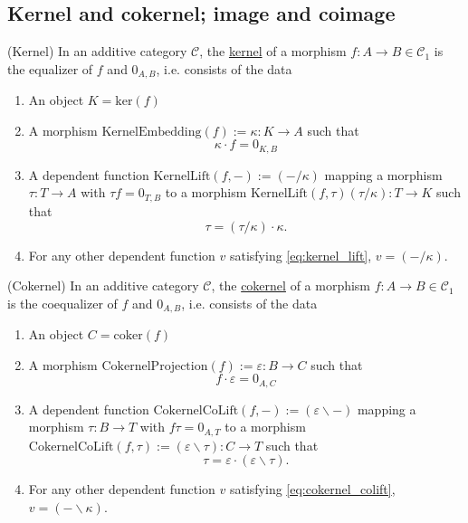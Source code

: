 \subsection{Kernel and cokernel; image and coimage}

\begin{definition}{(Kernel)}
In an additive category $\mathcal{C}$, the \ul{kernel} of a morphism $f : A \rightarrow B \in \mathcal{C}_{1}$ is the equalizer of $f$ and $0_{A,B}$,
i.e. consists of the data
\begin{enumerate}
\renewcommand{\labelenumi}{(\theenumi)}
\item An object $K = \mathrm{ker}(f)$
\item A morphism $\mathrm{KernelEmbedding}(f) := \kappa : K \rightarrow A$ such that
\[
\kappa \cdot f = 0_{K,B}
\]
\item A dependent function $\mathrm{KernelLift}(f,-) := ( - /\kappa)$ mapping a morphism $\tau : T \rightarrow A$ with $\tau f = 0_{T,B}$ to a
morphism $\mathrm{KernelLift}(f,\tau) (\tau / \kappa) : T \rightarrow K$ such that
\[
\tau =\label{eq:kernel_lift} (\tau / \kappa) \cdot \kappa.
\]
\item For any other dependent function $v$ satisfying \eqref{eq:kernel_lift}, $v = ( - / \kappa)$.
\end{enumerate}
\end{definition}

\begin{definition}{(Cokernel)}
In an additive category $\mathcal{C}$, the \ul{cokernel} of a morphism $f : A \rightarrow B \in \mathcal{C}_{1}$ is the coequalizer of
$f$ and $0_{A,B}$, i.e. consists of the data
\begin{enumerate}
\renewcommand{\labelenumi}{(\theenumi)}
\item An object $C = \mathrm{coker}(f)$
\item A morphism $\mathrm{CokernelProjection}(f) := \varepsilon : B \rightarrow C$ such that
\[
f \cdot \varepsilon = 0_{A,C}
\]
\item A dependent function $\mathrm{CokernelCoLift}(f,-) := ( \varepsilon \backslash -)$ mapping a morphism $\tau : B \rightarrow T$ with
$f \tau  = 0_{A,T}$ to a morphism $\mathrm{CokernelCoLift}(f,\tau) := ( \varepsilon \backslash \tau) : C \rightarrow T$ such that
\[
\tau =\label{eq:cokernel_colift} \varepsilon \cdot (\varepsilon \backslash \tau).
\]
\item For any other dependent function $v$ satisfying \eqref{eq:cokernel_colift}, $v = ( - \backslash \kappa)$.
\end{enumerate}
\end{definition}

